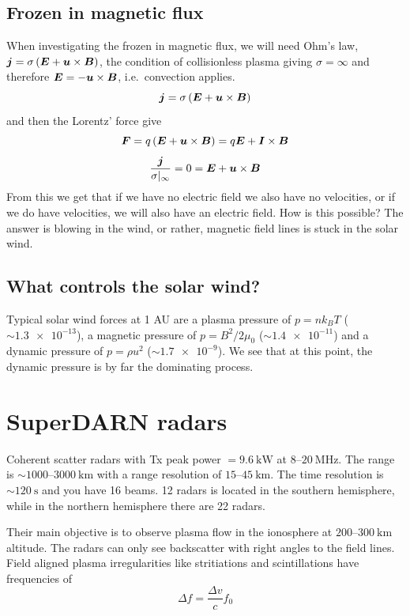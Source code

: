 \subsection{Frozen in magnetic flux}
When investigating the frozen in magnetic flux, we will need Ohm's law, \(\boldsymbol{j}=\sigma\left(\boldsymbol{E}+\boldsymbol{u}\times\boldsymbol{B}\right)\), the condition of collisionless plasma giving \(\sigma=\infty \) and therefore \(\boldsymbol{E}=-\boldsymbol{u}\times\boldsymbol{B}\), i.e.\ convection applies.
\begin{equation*}
    \boldsymbol{j}=\sigma\left(\boldsymbol{E}+\boldsymbol{u}\times\boldsymbol{B}\right)
\end{equation*}
and then the Lorentz' force give
\begin{equation*}
    \boldsymbol{F}=q\left(\boldsymbol{E}+\boldsymbol{u}\times\boldsymbol{B}\right)=q\boldsymbol{E}+\boldsymbol{I}\times\boldsymbol{B}
\end{equation*}
\begin{equation*}
    \frac{\boldsymbol{j}}{\sigma|_\infty}=0=\boldsymbol{E}+\boldsymbol{u}\times\boldsymbol{B}
\end{equation*}
From this we get that if we have no electric field we also have no velocities, or if we do have velocities, we will also have an electric field. How is this possible? The answer is blowing in the wind, or rather, magnetic field lines is stuck in the solar wind.

\subsection{What controls the solar wind?}
Typical solar wind forces at 1 AU are a plasma pressure of \(p=nk_{B}T\) (\(\sim \num{1.3e-13}\)), a magnetic pressure of \(p=B^2/2\mu_0\) (\(\sim \num{1.4e-11}\)) and a dynamic pressure of \(p=\rho u^2\) (\(\sim \num{1.7e-9}\)). We see that at this point, the dynamic pressure is by far the dominating process.

\section{SuperDARN radars}
Coherent scatter radars with Tx peak power \(=\SI{9.6}{\kilo\watt}\) at \(8\)--\(\SI{20}{\mega\hertz}\). The range is \(\sim 1000\)--\(\SI{3000}{\kilo\metre}\) with a range resolution of \(15\)--\(\SI{45}{\kilo\metre}\). The time resolution is \(\sim\SI{120}{\second}\) and you have 16 beams. 12 radars is located in the southern hemisphere, while in the northern hemisphere there are 22 radars.

Their main objective is to observe plasma flow in the ionosphere at \(200\)--\(\SI{300}{\kilo\metre}\) altitude. The radars can only see backscatter with right angles to the field lines. Field aligned plasma irregularities like stritiations and scintillations have frequencies of
\begin{equation*}
    \Delta f=\frac{\Delta v}{c}f_0
\end{equation*}

